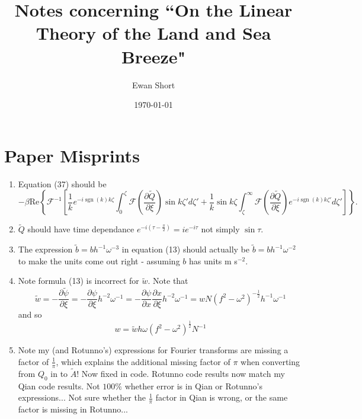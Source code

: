 \documentclass[12pt]{article}
\title{Notes concerning ``On the Linear Theory of the Land and Sea Breeze"  \citep{rotunno83}}
\author{Ewan Short}
\date{\today}
\DeclareMathOperator{\sgn}{sgn}
\begin{document}
\maketitle

\section{Paper Misprints}
\begin{enumerate}
\item
Equation (37) should be 
\begin{equation*}
 -\beta \textrm{Re}\left\{ \mathcal{F}^{-1}\left[ \frac{1}{k}e^{-i\sgn(k) k \zeta} \int_0^\zeta \mathcal{F}\left(\frac{\partial \tilde{Q}}{\partial \xi}\right) \sin k\zeta' d\zeta' + \frac{1}{k}\sin k \zeta \int_\zeta^\infty \mathcal{F}\left(\frac{\partial \tilde{Q}}{\partial \xi}\right) e^{-i\sgn(k)k\zeta'} d\zeta' \right] \right\}.
\end{equation*}
\item
$\tilde{Q}$ should have time dependance $e^{-i\left(\tau-\frac{\pi}{2}\right)}=ie^{-i\tau}$ not simply $\sin\tau$. 
\item
The expression $\tilde{b} = b h^{-1} \omega^{-3}$ in equation (13) should actually be $\tilde{b} = b h^{-1} \omega^{-2}$ to make the units come out right - assuming $b$ has units m s$^{-2}$.
\item
Note formula (13) is incorrect for $\tilde{w}$. Note that 
\begin{equation}
\tilde{w}=-\frac{\partial \tilde{\psi}}{\partial \xi}=-\frac{\partial \psi}{\partial \xi}h^{-2}\omega^{-1}=-\frac{\partial \psi}{\partial x}\frac{\partial x}{\partial \xi}h^{-2}\omega^{-1} =w N (f^2-\omega^2)^{-\frac{1}{2}} h^{-1}\omega^{-1} 
\end{equation}
and so 
\begin{equation}
w=\tilde{w}h\omega(f^2-\omega^2)^\frac{1}{2}N^{-1}
\end{equation}
\item
Note my (and Rotunno's) expressions for Fourier transforms are missing a factor of $\frac{1}{\pi}$, which explains the additional missing factor of $\pi$ when converting from $Q_0$ in \citet{qian09} to $\tilde{A}$! Now fixed in code. Rotunno code results now match my Qian code results. Not $100\%$ whether error is in Qian or Rotunno's expressions... Not sure whether the $\frac{1}{\pi}$ factor in Qian is wrong, or the same factor is missing in Rotunno...
\end{enumerate}
\end{document}
